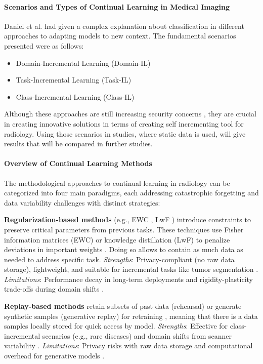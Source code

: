 \documentclass{IEEEcsmag}
\begin{document}
    \paragraph{Scenarios and Types of Continual Learning in Medical Imaging}
    Daniel et al. \cite{cite-19} had given a complex explanation about classification in different approaches to adapting models to new context.
    The fundamental scenarios presented were as follows:
    \begin{itemize}
        \item Domain-Incremental Learning (Domain-IL)
        \item Task-Incremental Learning (Task-IL)
        \item Class-Incremental Learning (Class-IL)
    \end{itemize}
    Although these approaches are still increasing security concerns \cite{cite-19}, they are crucial in creating innovative solutions in terms of creating self incrementing tool for radiology.
    Using those scenarios in studies, where static data is used, will give results that will be compared in further studies.

    \paragraph{Overview of Continual Learning Methods} 
    The methodological approaches to continual learning in radiology can be categorized into four main paradigms, each addressing catastrophic forgetting and data variability challenges with distinct strategies:
    
    \textbf{Regularization-based methods} (e.g., EWC \cite{cite-11}, LwF \cite{cite-2}) introduce constraints to preserve critical parameters from previous tasks.
    These techniques use Fisher information matrices (EWC) or knowledge distillation (LwF) to penalize deviations in important weights \cite{cite-11}\cite{cite-5}.
    Doing so allows to contain as much data as needed to address specific task.
    \textit{Strengths}: Privacy-compliant (no raw data storage), lightweight, and suitable for incremental tasks like tumor segmentation \cite{cite-11}\cite{cite-2}.  
    \textit{Limitations}: Performance decay in long-term deployments and rigidity-plasticity trade-offs during domain shifts \cite{cite-11}\cite{cite-17}.  
    
    \textbf{Replay-based methods} retain subsets of past data (rehearsal) or generate synthetic samples (generative replay) for retraining \cite{cite-1}\cite{cite-11}, meaning that there is a data samples locally stored for quick access by model.  
    \textit{Strengths}: Effective for class-incremental scenarios (e.g., rare diseases) and domain shifts from scanner variability \cite{cite-1}\cite{cite-11}.  
    \textit{Limitations}: Privacy risks with raw data storage and computational overhead for generative models \cite{cite-11}\cite{cite-17}.
    
\end{document}
